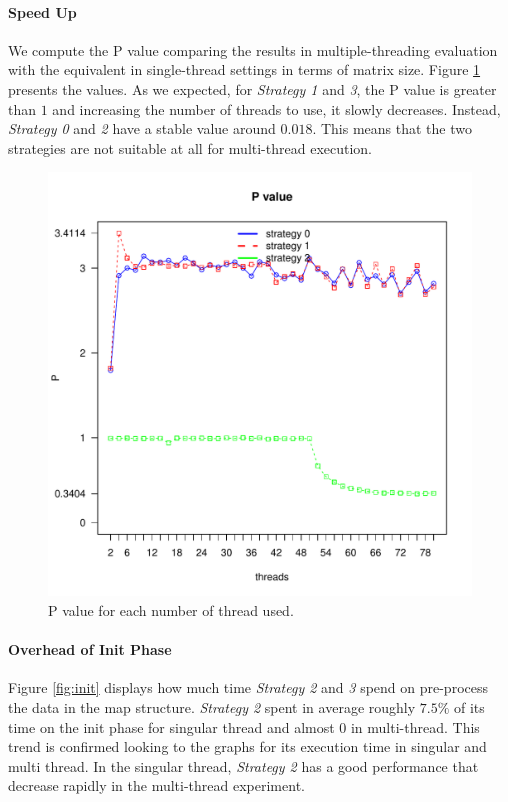 \documentclass[]{article}
\begin{document}
\paragraph{Speed Up}
We compute the P value comparing the results in multiple-threading evaluation with the equivalent in single-thread settings in terms of matrix size.  Figure \ref{fig:speed_up} presents the values. 
As we expected, for \textit{Strategy 1} and \textit{3}, the P value is greater than $1$ and increasing the number of threads to use, it slowly decreases.
Instead, \textit{Strategy 0} and \textit{2} have a stable value around $0.018$. This means that the two strategies are not suitable at all for multi-thread execution.
\begin{figure}[H]
    \centering
    \includegraphics[width=1\textwidth]{img/speedup.pdf}
    \caption
    {P value for each number of thread used.}
    \label{fig:speed_up}
\end{figure}

\newpage
\paragraph{Overhead of Init Phase}
Figure \ref{fig:init} displays how much time \textit{Strategy 2} and \textit{3} spend on pre-process the data in the map structure. \textit{Strategy 2} spent in average roughly $7.5\%$ of its time on the init phase for singular thread and almost $0$ in multi-thread. This trend is confirmed looking to the graphs for its execution time in singular and multi thread. In the singular thread, \textit{Strategy 2} has a good performance that decrease rapidly in the multi-thread experiment.
\end{document}
